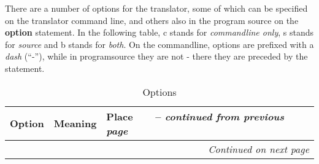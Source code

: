 There are a number of options for the translator, some of which can be
specified on the translator command line, and others also in the
program source on the \textbf{option} statement. In the following
table, c stands for \emph{commandline only}, s stands for
\emph{source} and b stands for \emph{both}. On the commandline,
options are prefixed with a \emph{dash} (``-''), while in
programsource they are not - there they are preceded by the
 statement.
\begin{longtable}[l]{|l|p{10cm}|l|}
\caption{ Options } \\
\hline
\rowcolor[gray]{0.8} \bfseries Option & \bfseries Meaning & \bfseries Place   \
\endfirsthead
\multicolumn{3}{r}%
{{\tablename\ \thetable{} -- \emph{continued from previous page}}} \\
\endhead
\hline \multicolumn{3}{r}{\emph{Continued on next page}}
\endfoot


\end{longtable}
